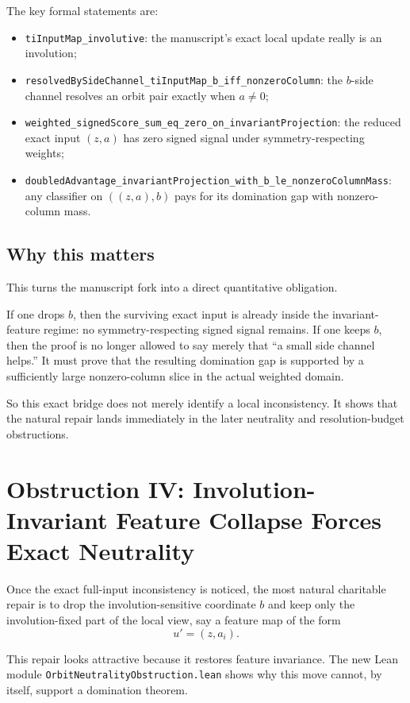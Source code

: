 \documentclass[11pt]{article}
\theoremstyle{remark}
\begin{document}
\noindent
The key formal statements are:
\begin{itemize}[leftmargin=1.5em]
  \item \texttt{tiInputMap\_involutive}: the manuscript's exact local update really is an
  involution;
  \item \texttt{resolvedBySideChannel\_tiInputMap\_b\_iff\_nonzeroColumn}: the \(b\)-side channel
  resolves an orbit pair exactly when \(a \neq 0\);
  \item \texttt{weighted\_signedScore\_sum\_eq\_zero\_on\_invariantProjection}: the reduced exact
  input \((z,a)\) has zero signed signal under symmetry-respecting weights;
  \item \texttt{doubledAdvantage\_invariantProjection\_with\_b\_le\_nonzeroColumnMass}: any
  classifier on \(((z,a),b)\) pays for its domination gap with nonzero-column mass.
\end{itemize}

\subsection{Why this matters}

This turns the manuscript fork into a direct quantitative obligation.

If one drops \(b\), then the surviving exact input is already inside the invariant-feature regime:
no symmetry-respecting signed signal remains.  If one keeps \(b\), then the proof is no longer
allowed to say merely that ``a small side channel helps.''  It must prove that the resulting
domination gap is supported by a sufficiently large nonzero-column slice in the actual weighted
domain.

So this exact bridge does not merely identify a local inconsistency.  It shows that the natural
repair lands immediately in the later neutrality and resolution-budget obstructions.

\section{Obstruction IV: Involution-Invariant Feature Collapse Forces Exact Neutrality}

Once the exact full-input inconsistency is noticed, the most natural charitable repair is to drop
the involution-sensitive coordinate \(b\) and keep only the involution-fixed part of the local view,
say a feature map of the form
\[
  u' = (z, a_i).
\]

This repair looks attractive because it restores feature invariance.  The new Lean module
\texttt{OrbitNeutralityObstruction.lean} shows why this move cannot, by itself, support a
domination theorem.
\end{document}
